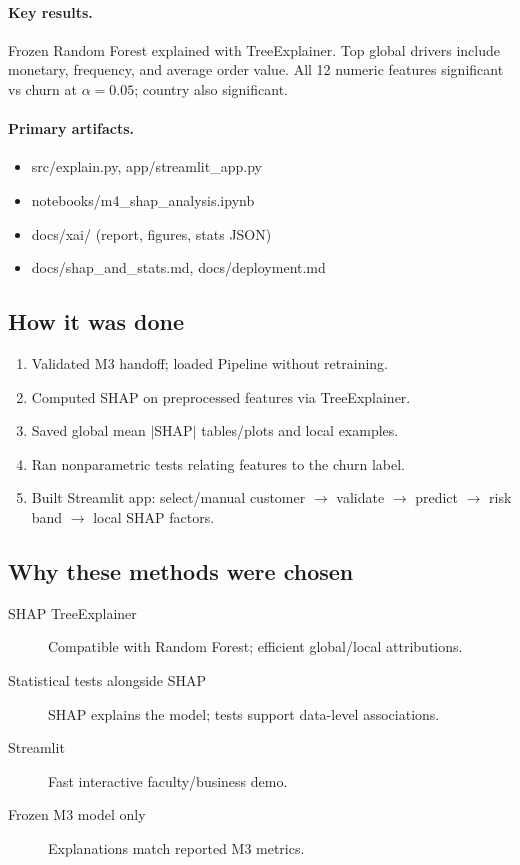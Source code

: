 \documentclass[11pt,a4paper]{article}
\renewcommand{\texttt}[1]{#1}
\begin{document}
\paragraph{Key results.}
Frozen Random Forest explained with TreeExplainer. Top global drivers include
monetary, frequency, and average order value. All 12 numeric features
significant vs churn at $\alpha=0.05$; country also significant.

\paragraph{Primary artifacts.}
\begin{itemize}
  \item \texttt{src/explain.py}, \texttt{app/streamlit\_app.py}
  \item \texttt{notebooks/m4\_shap\_analysis.ipynb}
  \item \texttt{docs/xai/} (report, figures, stats JSON)
  \item \texttt{docs/shap\_and\_stats.md}, \texttt{docs/deployment.md}
\end{itemize}

\subsection{How it was done}
\begin{enumerate}
  \item Validated M3 handoff; loaded Pipeline without retraining.
  \item Computed SHAP on preprocessed features via \texttt{TreeExplainer}.
  \item Saved global mean $|$SHAP$|$ tables/plots and local examples.
  \item Ran nonparametric tests relating features to the churn label.
  \item Built Streamlit app: select/manual customer $\rightarrow$ validate $\rightarrow$
        predict $\rightarrow$ risk band $\rightarrow$ local SHAP factors.
\end{enumerate}

\subsection{Why these methods were chosen}
\begin{description}
  \item[SHAP TreeExplainer]
        Compatible with Random Forest; efficient global/local attributions.
  \item[Statistical tests alongside SHAP]
        SHAP explains the model; tests support data-level associations.
  \item[Streamlit]
        Fast interactive faculty/business demo.
  \item[Frozen M3 model only]
        Explanations match reported M3 metrics.
\end{description}
\end{document}
